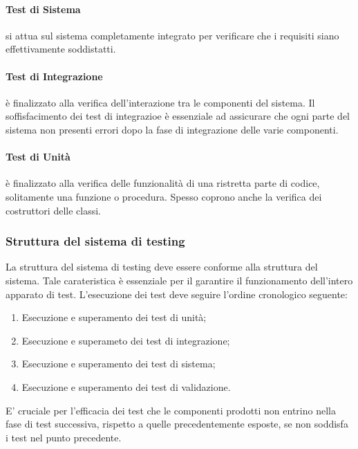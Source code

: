 \documentclass[12pt,a4paper]{article}
\begin{document}
	\paragraph{Test di Sistema} si attua sul sistema completamente integrato per verificare che i requisiti siano effettivamente soddistatti.
	\paragraph{Test di Integrazione} è finalizzato alla verifica dell'interazione tra le componenti del sistema. Il soffisfacimento dei test di integrazioe è essenziale ad assicurare che ogni parte del sistema non presenti errori dopo la fase di integrazione delle varie componenti.
	\paragraph{Test di Unità} è finalizzato alla verifica delle funzionalità di una ristretta parte di codice, solitamente una funzione o procedura. Spesso coprono anche la verifica dei costruttori delle classi.
\subsubsection{Struttura del sistema di testing}
La struttura del sistema di testing deve essere conforme alla struttura del sistema. Tale carateristica è essenziale per il garantire il funzionamento dell'intero apparato di test. 
L'esecuzione dei test deve seguire l'ordine cronologico seguente:
\begin{enumerate}
	\item Esecuzione e superamento dei test di unità;
	\item Esecuzione e superameto dei test di integrazione;
	\item Esecuzione e superamento dei test di sistema;
	\item Esecuzione e superamento dei test di validazione.
\end{enumerate}
E' cruciale per l'efficacia dei test che le componenti prodotti non entrino nella fase di test successiva, rispetto a quelle precedentemente esposte, se non soddisfa i test nel punto precedente.
\end{document}
